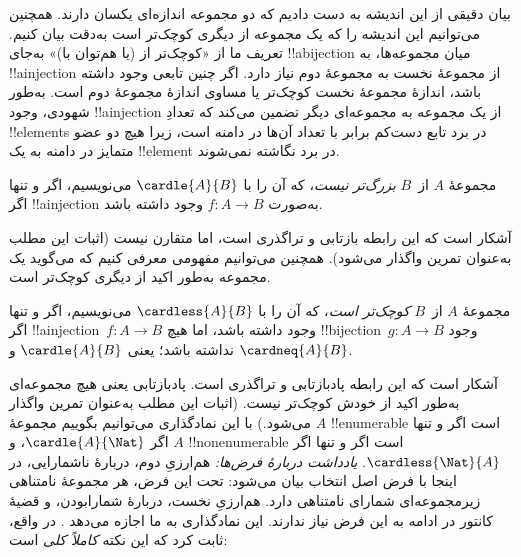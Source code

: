 \documentclass[../../../include/open-logic-section]{subfiles}
\begin{document}


\begin{explain}
بیان دقیقی از این اندیشه به دست دادیم که دو مجموعه اندازه‌ای یکسان
دارند. همچنین می‌توانیم این اندیشه را که یک مجموعه از دیگری کوچک‌تر
است به‌دقت بیان کنیم. تعریف ما از «کوچک‌تر از (یا هم‌توان با)» به‌جای
!!a{bijection} میان مجموعه‌ها، به !!a{injection} از مجموعهٔ نخست به
مجموعهٔ دوم نیاز دارد. اگر چنین تابعی وجود داشته باشد، اندازهٔ مجموعهٔ
نخست کوچک‌تر یا مساوی اندازهٔ مجموعهٔ دوم است. به‌طور شهودی، وجود
!!a{injection} از یک مجموعه به مجموعه‌ای دیگر تضمین می‌کند که تعدادِ
!!{element}s در برد تابع دست‌کم برابر با تعداد آن‌ها در دامنه است، زیرا
هیچ دو عضو متمایز در دامنه به یک !!{element} در برد
نگاشته نمی‌شوند.
\end{explain}

\begin{defn}
مجموعهٔ $A$ از~$B$ \emph{بزرگ‌تر نیست}، که آن را با $\cardle{A}{B}$
می‌نویسیم، اگر و تنها اگر !!a{injection} به‌صورت $f \colon A \to B$
وجود داشته باشد.
\end{defn}

آشکار است که این رابطه بازتابی و تراگذری است، اما متقارن نیست (اثبات
این مطلب به‌عنوان تمرین واگذار می‌شود). همچنین می‌توانیم مفهومی معرفی
کنیم که می‌گوید یک مجموعه به‌طور اکید از دیگری کوچک‌تر است.

\begin{defn}
مجموعهٔ $A$ از~$B$ \emph{کوچک‌تر است}، که آن را با $\cardless{A}{B}$
می‌نویسیم، اگر و تنها اگر !!a{injection}~$f\colon A \to B$ وجود داشته
باشد، اما هیچ !!{bijection}~$g\colon A
\to B$ وجود نداشته باشد؛ یعنی $\cardle{A}{B}$ و $\cardneq{A}{B}$.
\end{defn}

آشکار است که این رابطه پادبازتابی و تراگذری است. پادبازتابی یعنی هیچ مجموعه‌ای به‌طور اکید از خودش کوچک‌تر نیست. (اثبات این مطلب
به‌عنوان تمرین واگذار می‌شود.) با این نمادگذاری می‌توانیم بگوییم
مجموعهٔ $A$ !!{enumerable} است اگر و تنها اگر $\cardle{A}{\Nat}$، و
$A$ !!{nonenumerable} است اگر و تنها اگر $\cardless{\Nat}{A}$.
\emph{یادداشت دربارهٔ فرض‌ها:} هم‌ارزیِ دوم، دربارهٔ ناشمارایی، در اینجا با
فرض اصل انتخاب بیان می‌شود: تحت این فرض، هر مجموعهٔ نامتناهی زیرمجموعه‌ای
شمارای نامتناهی دارد. هم‌ارزیِ نخست، دربارهٔ شمارابودن، و قضیهٔ کانتور در
ادامه به این فرض نیاز ندارند.
این نمادگذاری به ما اجازه می‌دهد
. در واقع،
\citet{Cantor1892} ثابت کرد که این نکته \emph{کاملاً کلی} است:
\end{document}

